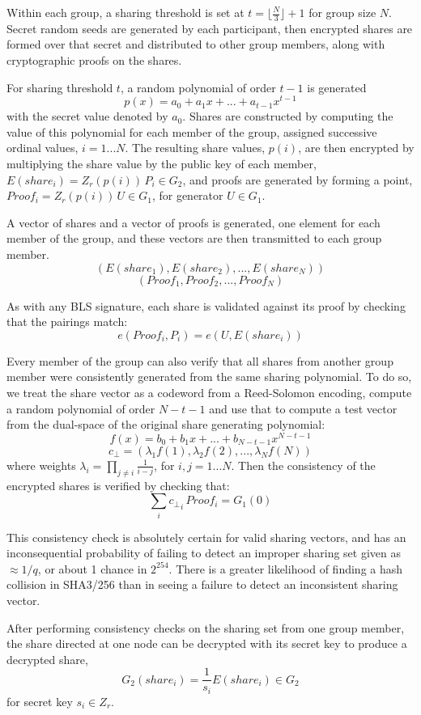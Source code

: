 \documentclass{yellowpaper}
\begin{document}
Within each group, a sharing threshold is set at $t = \lfloor \frac{N}{3} \rfloor + 1$ for group size $N$. Secret random seeds are generated by each participant, then encrypted shares are formed over that secret and distributed to other group members, along with cryptographic proofs on the shares.

For sharing threshold $t$, a random polynomial of order $t-1$ is generated $$p(x) = a_0 + a_1 x + ... + a_{t-1} x^{t-1}$$ with the secret value denoted by $a_0$.  Shares are constructed by computing the value of this polynomial for each member of the group, assigned successive ordinal values, $i = 1 ... N$. The resulting share values, $p(i)$, are then encrypted by multiplying the share value by the public key of each member, $E(share_i) = Z_r(p(i))\, P_i \in G_2$, and proofs are generated by forming a point, $Proof_i = Z_r(p(i)) \,U \in G_1$, for generator $U \in G_1$. 

A vector of shares and a vector of proofs is generated, one element for each member of the group, and these vectors are then transmitted to each group member.
$$(E(share_1), E(share_2), ..., E(share_N))$$
$$ (Proof_1, Proof_2, ..., Proof_N)$$

As with any BLS signature, each share is validated against its proof by checking that the pairings match:
$$ e(Proof_i, P_i) = e(U, E(share_i))$$

Every member of the group can also verify that all shares from another group member were consistently generated from the same sharing polynomial. To do so, we treat the share vector as a codeword from a Reed-Solomon encoding\cite{scrape}, compute a random polynomial of order $N - t - 1$ and use that to compute a test vector from the dual-space of the original share generating polynomial:
$$f(x) = b_0 + b_1 x + ... + b_{N-t-1} x^{N-t-1}$$
$$c_{\perp} = (\lambda_1 f(1), \lambda_2 f(2), ... , \lambda_N f(N))$$
where weights $\lambda_i = \prod_{j \ne i} \frac{1}{i-j}$, for $ i,j = 1...N$.
Then the consistency of the encrypted shares is verified by checking that:
$$\sum_i {c_{\perp}}_i \, Proof_i = G_1(0)$$

This consistency check is absolutely certain for valid sharing vectors, and has an inconsequential probability of failing to detect an improper sharing set given as $\approx 1/q$, or about 1 chance in $2^{254}$. There is a greater likelihood of finding a hash collision in SHA3/256 than in seeing a failure to detect an inconsistent sharing vector.

After performing consistency checks on the sharing set from one group member, the share directed at one node can be decrypted with its secret key to produce a decrypted share, $$G_2(share_i) = \frac{1}{s_i}E(share_i) \in G_2$$ for secret key $s_i \in Z_r$.
\end{document}
